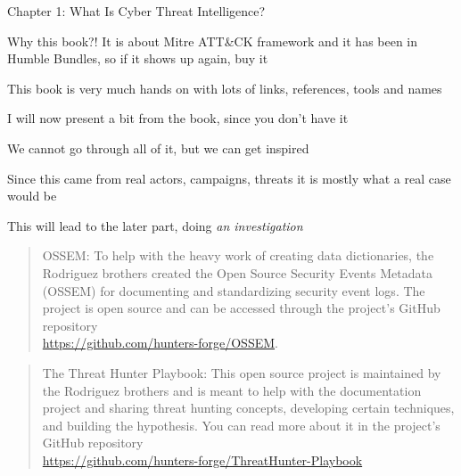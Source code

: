 \documentclass[Screen16to9,17pt]{foils}
\begin{document}
\begin{list2}
\item Chapter 1: What Is Cyber Threat Intelligence?
\item Why this book?! It is about Mitre ATT\&CK framework and it has been in Humble Bundles, so if it shows up again, buy it
\item This book is very much hands on with lots of links, references, tools and names
\item I will now present a bit from the book, since you don't have it
\end{list2}



\begin{list2}
\item We cannot go through all of it, but we can get inspired
\item Since this came from real actors, campaigns, threats it is mostly what a real case would be
\end{list2}

This will lead to the later part, doing \emph{an investigation}




\begin{quote}
OSSEM: To help with the heavy work of creating data dictionaries, the Rodriguez
brothers created the Open Source Security Events Metadata (OSSEM) for
documenting and standardizing security event logs. The project is open source and
can be accessed through the project's GitHub repository\\
\url{https://github.com/hunters-forge/OSSEM}.
\end{quote}




\begin{quote}
The Threat Hunter Playbook: This open source project is maintained by the
Rodriguez brothers and is meant to help with the documentation project and
sharing threat hunting concepts, developing certain techniques, and building
the hypothesis. You can read more about it in the project's GitHub repository\\
\url{https://github.com/hunters-forge/ThreatHunter-Playbook}
\end{quote}

\end{document}
